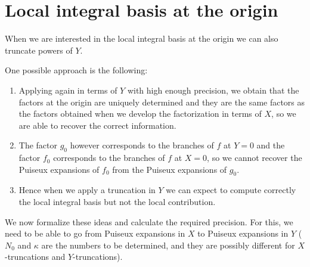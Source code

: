 \documentclass[a4paper,11pt,reqno]{amsart}%
\theoremstyle{definition}
\theoremstyle{plain}
\theoremstyle{remark}
\begin{document}
\section{Local integral basis at the origin}

When we are interested in the local integral basis at the origin we can also truncate powers of $Y$.

One possible approach is the following:
\begin{enumerate}
\item Applying again \cite[Proposition 23]{poteaux2021}  in terms of $Y$ with high enough precision, we obtain that the factors at the origin are uniquely determined and they are the same factors as the factors obtained when we develop the factorization in terms of $X$, so we are able to recover the correct information.
\item The factor $g_0$ however corresponds to the branches of $f$ at $Y = 0$ and the factor $f_0$ corresponds to the branches of $f$ at $X = 0$, so we cannot recover the Puiseux expansions of $f_0$ from the Puiseux expansions of $g_0$.
\item Hence when we apply a truncation in $Y$ we can expect to compute correctly the local integral basis but not the local contribution.
\end{enumerate}

We now formalize these ideas and calculate the required precision. For this, we need to be able to go from Puiseux expansions in $X$ to Puiseux expansions in $Y$ ($N_0$ and $\kappa$ are the numbers to be determined, and they are possibly different for $X$-truncations and $Y$-truncations).
\end{document}

